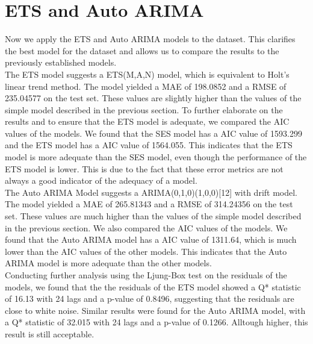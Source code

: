 \section{ETS and Auto ARIMA}\label{sec:ets-and-auto-arima}

Now we apply the ETS and Auto ARIMA models to the dataset.
This clarifies the best model for the dataset and allows us to compare the results to the previously established models.\\

The ETS model suggests a ETS(M,A,N) model, which is equivalent to Holt's linear trend method.
The model yielded a MAE of 198.0852 and a RMSE of 235.04577 on the test set.
These values are slightly higher than the values of the simple model described in the previous section.
To further elaborate on the results and to ensure that the ETS model is adequate, we compared the AIC values of the models.
We found that the SES model has a AIC value of 1593.299 and the ETS model has a AIC value of 1564.055.
This indicates that the ETS model is more adequate than the SES model, even though the performance of the ETS model is lower.
This is due to the fact that these error metrics are not always a good indicator of the adequacy of a model.\\

The Auto ARIMA Model suggests a ARIMA(0,1,0)(1,0,0)[12] with drift model.
The model yielded a MAE of 265.81343 and a RMSE of 314.24356 on the test set.
These values are much higher than the values of the simple model described in the previous section.
We also compared the AIC values of the models.
We found that the Auto ARIMA model has a AIC value of 1311.64, which is much lower than the AIC values of the other models.
This indicates that the Auto ARIMA model is more adequate than the other models.\\

Conducting further analysis using the Ljung-Box test on the residuals of the models, we found that the the residuals of the ETS model showed a Q* statistic of 16.13 with 24 lags and a p-value of 0.8496, suggesting that the residuals are close to white noise. Similar results were found for the Auto ARIMA model, with a Q* statistic of 32.015 with 24 lags and a p-value of 0.1266. Alltough higher, this result is still acceptable.\\